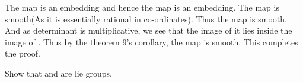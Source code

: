 \documentclass{article}
\begin{document}
    The map  is an embedding and hence the map  is an embedding. The map \mm{\tilde{\mu}} is smooth(As it is essentially rational in co-ordinates).
    Thus the map  is smooth. And as determinant is multiplicative, we see that the image of it lies inside the image of .
    Thus by the theorem 9's corollary, the map \mm{\mu} is smooth. This completes the proof.
    
    \begin{exercise*}
        Show that  and  are lie groups.
    \end{exercise*}
    
\end{document}
